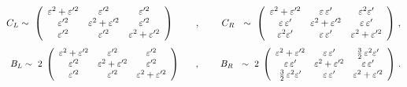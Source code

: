 \documentclass[a4paper,11pt]{article}
\newcommand{\bea}{\begin{eqnarray}}
\newcommand{\eea}{\end{eqnarray}}
\newcommand{\vep}{\varepsilon}
\newcommand{\nn}{\nonumber}
\begin{document}
\bea
  C_L & \sim~ \left(\begin{array}{ccc}
        	  	   \vep^2+\vep'^2 &        \vep'^2 & \vep'^2 \\
                      \vep'^2 & \vep^2+\vep'^2 & \vep'^2 \\
                      \vep'^2 &        \vep'^2 & \vep^2+\vep'^2
             \end{array} \right)
             \hspace{0.8cm} , \hspace{0.8cm}
 C_R ~~\sim~ \left(\begin{array}{ccc}
               		\vep^2+\vep'^2 & \vep\,\vep'     & \vep^2\vep' \\
                      \vep\,\vep'  & \vep^2+\vep'^2  & \vep\,\vep' \\
                	    	\vep^2\vep'    & \vep\,\vep' 	& \vep^2+\vep'^2
             \end{array} \right)   \, ,\nn\\
\eea
\bea             
  \hspace{0.15cm} B_L & \sim~  2\; \left(\begin{array}{ccc}
                  \vep^2+\vep'^2 	&        \vep'^2 & \vep'^2 \\
                         \vep'^2 	& \vep^2+\vep'^2 & \vep'^2 \\
                         \vep'^2 	&        \vep'^2 & \vep^2+\vep'^2
             \end{array} \right)
             \hspace{0.6cm} , \hspace{0.8cm}
  B_R ~~\sim~ 2\; \left(\begin{array}{ccc}
               		 \vep^2+\vep'^2 	& \vep\,\vep'    & \frac{3}{2}\,\vep^2\vep' \\
                        \vep\,\vep'  & \vep^2+\vep'^2 & \vep\,\vep' \\
            \frac{3}{2}\,\vep^2\vep' &  \vep\,\vep' 	 & \vep^2+\vep'^2
             \end{array} \right)\,.\nn\\     
 \label{eqn:A4BLBR}
\eea
\end{document}
